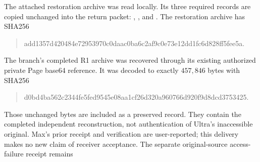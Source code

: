 \documentclass[11pt]{article}
\theoremstyle{definition}\newtheorem{definition}[theorem]{Definition}
\begin{document}
The attached restoration archive was read locally. Its three required records are copied unchanged into the return packet: , , and . The restoration archive has SHA256
\begin{quote}\ttfamily\small\raggedright
add1357d420484e72953970c0daac0ba6c2af9c0e73e12dd1fc6d828ff5fee5a.
\end{quote}
The branch's completed R1 archive was recovered through its existing authorized private Page base64 reference. It was decoded to exactly $457{,}846$ bytes with SHA256
\begin{quote}\ttfamily\small\raggedright
d0bd4ba562c2344fe5fed9545e08aa1cf26d320a960766d920f9d8dcd3753425.
\end{quote}
Those unchanged bytes are included as a preserved record. They contain the completed independent reconstruction, not authentication of Ultra's inaccessible original. Max's prior receipt and verification are user-reported; this delivery makes no new claim of receiver acceptance. The separate original-source access-failure receipt remains
\end{document}
